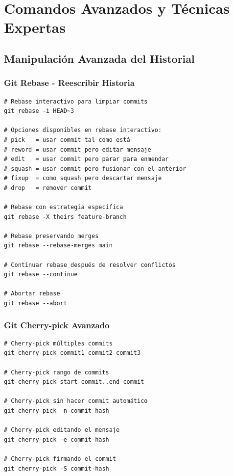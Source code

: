 \documentclass[12pt,a4paper]{article}
\begin{document}
\section{Comandos Avanzados y Técnicas Expertas}

\subsection{Manipulación Avanzada del Historial}

\subsubsection{Git Rebase - Reescribir Historia}
\begin{lstlisting}[caption=Rebase interactivo y avanzado]
# Rebase interactivo para limpiar commits
git rebase -i HEAD~3

# Opciones disponibles en rebase interactivo:
# pick   = usar commit tal como está
# reword = usar commit pero editar mensaje
# edit   = usar commit pero parar para enmendar
# squash = usar commit pero fusionar con el anterior
# fixup  = como squash pero descartar mensaje
# drop   = remover commit

# Rebase con estrategia específica
git rebase -X theirs feature-branch

# Rebase preservando merges
git rebase --rebase-merges main

# Continuar rebase después de resolver conflictos
git rebase --continue

# Abortar rebase
git rebase --abort
\end{lstlisting}

\subsubsection{Git Cherry-pick Avanzado}
\begin{lstlisting}[caption=Cherry-pick con opciones avanzadas]
# Cherry-pick múltiples commits
git cherry-pick commit1 commit2 commit3

# Cherry-pick rango de commits
git cherry-pick start-commit..end-commit

# Cherry-pick sin hacer commit automático
git cherry-pick -n commit-hash

# Cherry-pick editando el mensaje
git cherry-pick -e commit-hash

# Cherry-pick firmando el commit
git cherry-pick -S commit-hash
\end{lstlisting}
\end{document}
